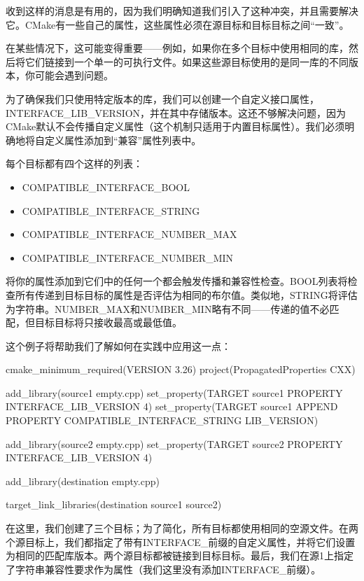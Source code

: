 收到这样的消息是有用的，因为我们明确知道我们引入了这种冲突，并且需要解决它。CMake有一些自己的属性，这些属性必须在源目标和目标目标之间“一致”。

在某些情况下，这可能变得重要——例如，如果你在多个目标中使用相同的库，然后将它们链接到一个单一的可执行文件。如果这些源目标使用的是同一库的不同版本，你可能会遇到问题。

为了确保我们只使用特定版本的库，我们可以创建一个自定义接口属性，INTERFACE\_LIB\_VERSION，并在其中存储版本。这还不够解决问题，因为CMake默认不会传播自定义属性（这个机制只适用于内置目标属性）。我们必须明确地将自定义属性添加到“兼容”属性列表中。

每个目标都有四个这样的列表：

\begin{itemize}
\item
COMPATIBLE\_INTERFACE\_BOOL

\item
COMPATIBLE\_INTERFACE\_STRING

\item
COMPATIBLE\_INTERFACE\_NUMBER\_MAX

\item
COMPATIBLE\_INTERFACE\_NUMBER\_MIN
\end{itemize}

将你的属性添加到它们中的任何一个都会触发传播和兼容性检查。BOOL列表将检查所有传递到目标目标的属性是否评估为相同的布尔值。类似地，STRING将评估为字符串。NUMBER\_MAX和NUMBER\_MIN略有不同——传递的值不必匹配，但目标目标将只接收最高或最低值。

这个例子将帮助我们了解如何在实践中应用这一点：


\begin{cmake}
cmake_minimum_required(VERSION 3.26)
project(PropagatedProperties CXX)

add_library(source1 empty.cpp)
set_property(TARGET source1 PROPERTY INTERFACE_LIB_VERSION 4)
set_property(TARGET source1 APPEND PROPERTY
             COMPATIBLE_INTERFACE_STRING LIB_VERSION)

add_library(source2 empty.cpp)
set_property(TARGET source2 PROPERTY INTERFACE_LIB_VERSION 4)

add_library(destination empty.cpp)

target_link_libraries(destination source1 source2)
\end{cmake}

在这里，我们创建了三个目标；为了简化，所有目标都使用相同的空源文件。在两个源目标上，我们都指定了带有INTERFACE\_前缀的自定义属性，并将它们设置为相同的匹配库版本。两个源目标都被链接到目标目标。最后，我们在源1上指定了字符串兼容性要求作为属性（我们这里没有添加INTERFACE\_前缀）。

